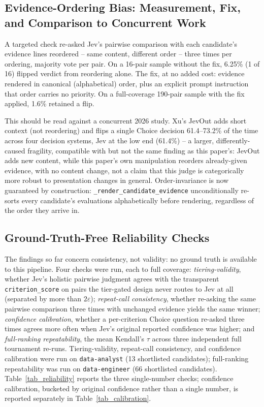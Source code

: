 \documentclass[journal]{IEEEtran}
\begin{document}
\subsection{Evidence-Ordering Bias: Measurement, Fix, and Comparison to Concurrent Work}
A targeted check re-asked Jev's pairwise comparison with each candidate's evidence lines reordered -- same content, different order -- three times per ordering, majority vote per pair. On a 16-pair sample without the fix, 6.25\% (1 of 16) flipped verdict from reordering alone. The fix, at no added cost: evidence rendered in canonical (alphabetical) order, plus an explicit prompt instruction that order carries no priority. On a full-coverage 190-pair sample with the fix applied, 1.6\% retained a flip.

This should be read against a concurrent 2026 study. Xu's JevOut adds short context (not reordering) and flips a single Choice decision 61.4--73.2\% of the time across four decision systems, Jev at the low end (61.4\%) \cite{ref8} -- a larger, differently-caused fragility, compatible with but not the same finding as this paper's: JevOut adds new content, while this paper's own manipulation reorders already-given evidence, with no content change, not a claim that this judge is categorically more robust to presentation changes in general. Order-invariance is now guaranteed by construction: \texttt{\_render\_candidate\_evidence} unconditionally re-sorts every candidate's evaluations alphabetically before rendering, regardless of the order they arrive in.

\subsection{Ground-Truth-Free Reliability Checks}
The findings so far concern consistency, not validity: no ground truth is available to this pipeline. Four checks were run, each to full coverage: \emph{tiering-validity}, whether Jev's holistic pairwise judgment agrees with the transparent \texttt{criterion\_score} on pairs the tier-gated design never routes to Jev at all (separated by more than $2\varepsilon$); \emph{repeat-call consistency}, whether re-asking the same pairwise comparison three times with unchanged evidence yields the same winner; \emph{confidence calibration}, whether a per-criterion Choice question re-asked three times agrees more often when Jev's original reported confidence was higher; and \emph{full-ranking repeatability}, the mean Kendall's $\tau$ across three independent full tournament re-runs. Tiering-validity, repeat-call consistency, and confidence calibration were run on \texttt{data-analyst} (13 shortlisted candidates); full-ranking repeatability was run on \texttt{data-engineer} (66 shortlisted candidates). Table~\ref{tab_reliability} reports the three single-number checks; confidence calibration, bucketed by original confidence rather than a single number, is reported separately in Table~\ref{tab_calibration}.
\end{document}
